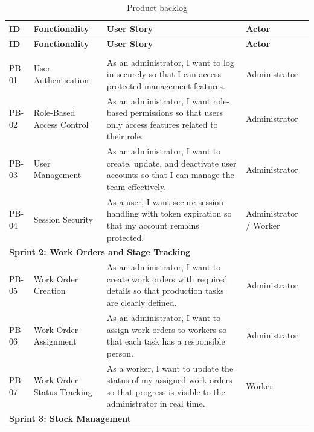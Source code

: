 \begin{longtable}{|p{}|p{}|p{}|p{}|}
    \caption{Product backlog}\label{tab:product-backlog}\\
    \hline
    \textbf{ID} & \textbf{Fonctionality} & \textbf{User Story} & \textbf{Actor} \\
    \hline
    \endfirsthead

    \hline
    \textbf{ID} & \textbf{Fonctionality} & \textbf{User Story} & \textbf{Actor} \\
    \hline
    \endhead

    \hline
    \endfoot

    \hline
    \multicolumn{4}{|l|}{\textbf{Sprint 1: Foundation and Access Control}} \\
    \hline
    PB-01 & User Authentication & As an administrator, I want to log in securely so that I can access protected management features. & Administrator \\
    \hline
    PB-02 & Role-Based Access Control & As an administrator, I want role-based permissions so that users only access features related to their role. & Administrator \\
    \hline
    PB-03 & User Management & As an administrator, I want to create, update, and deactivate user accounts so that I can manage the team effectively. & Administrator \\
    \hline
    PB-04 & Session Security & As a user, I want secure session handling with token expiration so that my account remains protected. & Administrator / Worker \\
    \hline
    \multicolumn{4}{|l|}{\textbf{Sprint 2: Work Orders and Stage Tracking}} \\
    \hline
    PB-05 & Work Order Creation & As an administrator, I want to create work orders with required details so that production tasks are clearly defined. & Administrator \\
    \hline
    PB-06 & Work Order Assignment & As an administrator, I want to assign work orders to workers so that each task has a responsible person. & Administrator \\
    \hline
    PB-07 & Work Order Status Tracking & As a worker, I want to update the status of my assigned work orders so that progress is visible to the administrator in real time. & Worker \\
    \hline
    \multicolumn{4}{|l|}{\textbf{Sprint 3: Stock Management}} \\
    \hline

\end{longtable}
